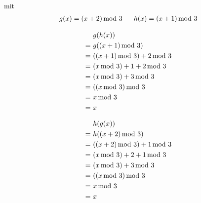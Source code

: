 \documentclass[12pt,a4paper, usenames, dvipsnames]{article}
\theoremstyle{mystyle}
\theoremstyle{definition}
\begin{document}
mit
\begin{align*}
g(x)=(x + 2) \hspace*{-0.5em} \mod 3 \ \ \ \ \ h(x) = (x+1) \hspace*{-0.5em} \mod 3 
\end{align*}

\begin{minipage}[H]{0.5\textwidth}
      \begin{align*}
		 & g(h(x)) \\
		= \ & g((x+1) \hspace*{-0.5em} \mod 3) \\
		= \ & ((x+1) \hspace*{-0.5em} \mod 3) +2 \hspace*{-0.5em} \mod 3  \\
		= \ & (x \hspace*{-0.5em} \mod 3) +1 +2 \hspace*{-0.5em} \mod 3  \\
		= \ & (x \hspace*{-0.5em} \mod 3) +3 \hspace*{-0.5em} \mod 3  \\
		= \ & ((x \hspace*{-0.5em} \mod 3) \hspace*{-0.5em} \mod 3  \\
		= \ & x \hspace*{-0.5em} \mod 3 \\
		= \ & x \\
	\end{align*}
\end{minipage}
\begin{minipage}[H]{0.5\textwidth}
      \begin{align*}
		 & h(g(x)) \\
		= \ & h((x+2) \hspace*{-0.5em} \mod 3) \\
		= \ & ((x+2) \hspace*{-0.5em} \mod 3) +1 \hspace*{-0.5em} \mod 3  \\
		= \ & (x \hspace*{-0.5em} \mod 3) +2 +1 \hspace*{-0.5em} \mod 3  \\
		= \ & (x \hspace*{-0.5em} \mod 3) +3 \hspace*{-0.5em} \mod 3  \\
		= \ & ((x \hspace*{-0.5em} \mod 3) \hspace*{-0.5em} \mod 3  \\
		= \ & x \hspace*{-0.5em} \mod 3 \\
		= \ & x \\
	\end{align*}
\end{minipage}
\end{document}
